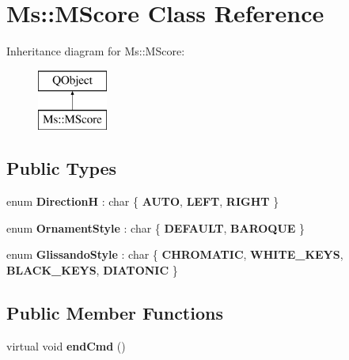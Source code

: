 \hypertarget{class_ms_1_1_m_score}{}\section{Ms\+:\+:M\+Score Class Reference}
\label{class_ms_1_1_m_score}
Inheritance diagram for Ms\+:\+:M\+Score\+:\begin{figure}[H]
\begin{center}
\leavevmode
\includegraphics[height=2.000000cm]{class_ms_1_1_m_score}
\end{center}
\end{figure}
\subsection*{Public Types}
\begin{DoxyCompactItemize}
\item 
\mbox{\label{class_ms_1_1_m_score_ac1a0c95bfede9e37dd3fd910905092b8}} 
enum {\bfseries DirectionH} \+: char \{ {\bfseries A\+U\+TO}, 
{\bfseries L\+E\+FT}, 
{\bfseries R\+I\+G\+HT}
 \}
\item 
\mbox{\label{class_ms_1_1_m_score_a1a82a38a1280478b964ff18ae4a0e03c}} 
enum {\bfseries Ornament\+Style} \+: char \{ {\bfseries D\+E\+F\+A\+U\+LT}, 
{\bfseries B\+A\+R\+O\+Q\+UE}
 \}
\item 
\mbox{\label{class_ms_1_1_m_score_a908f9946c536932c98d081416d214383}} 
enum {\bfseries Glissando\+Style} \+: char \{ {\bfseries C\+H\+R\+O\+M\+A\+T\+IC}, 
{\bfseries W\+H\+I\+T\+E\+\_\+\+K\+E\+YS}, 
{\bfseries B\+L\+A\+C\+K\+\_\+\+K\+E\+YS}, 
{\bfseries D\+I\+A\+T\+O\+N\+IC}
 \}
\end{DoxyCompactItemize}
\subsection*{Public Member Functions}
\begin{DoxyCompactItemize}
\item 
\mbox{\label{class_ms_1_1_m_score_a0e010a37d3a4fc2ac361dc7ee9803a8e}} 
virtual void {\bfseries end\+Cmd} ()
\end{DoxyCompactItemize}
